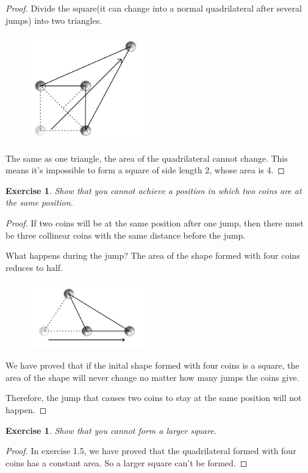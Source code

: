 \documentclass[12pt,a4]{article}
\theoremstyle{exercise}
\newtheorem{exercise}[theorem]{Exercise}
\begin{document}
\begin{proof}
    Divide the square(it can change into a normal quadrilateral after several jumps) into two triangles.

    \begin{figure}[H]
        \small
        \centering
        \includegraphics[width=5cm]{fourcoins.png}
        \label{fig:fourCoins}
    \end{figure}

    The same as one triangle, the area of the quadrilateral cannot change.
    This means it's impossible to form a square of side length 2, whose area is 4.

\end{proof}

\begin{exercise}
    Show that you cannot achieve a position in which two coins are at the same position.
\end{exercise}

\begin{proof}
    If two coins will be at the same position after one jump, then there must be three collinear coins with the same distance before the jump.

    What happens during the jump? The area of the shape formed with four coins reduces to half.

    \begin{figure}[H]
        \small
        \centering
        \includegraphics[width=5cm]{coinssameposition.png}
        \label{fig:coinsSamePosition}
    \end{figure}

    We have proved that if the inital shape formed with four coins is a square, the area of the shape will never change no matter how many jumps the coins give.

    Therefore, the jump that causes two coins to stay at the same position will not happen.

\end{proof}

\begin{exercise}
    Show that you cannot form a larger square.
\end{exercise}

\begin{proof}
    In exercise 1.5, we have proved that the quadrilateral formed with four coins has a constant area.
    So a larger square can't be formed.
\end{proof}
\end{document}
